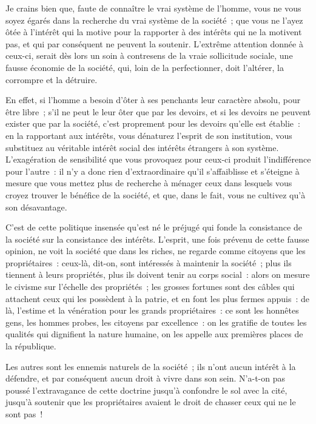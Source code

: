 \documentclass[french,twoside]{book} %
\begin{document}
Je crains bien que, faute de connaître le vrai système de l’homme, vous ne vous soyez égarés dans la recherche du vrai système de la société ; que vous ne l’ayez ôtée à l’intérêt qui la motive pour la rapporter à des intérêts qui ne la motivent pas, et qui par conséquent ne peuvent la soutenir. L’extrême attention donnée à ceux-ci, serait dès lors un soin à contresens de la vraie sollicitude sociale, une fausse économie de la société, qui, loin de la perfectionner, doit l’altérer, la corrompre et la détruire.\par
En effet, si l’homme a besoin d’ôter à ses penchants leur caractère absolu, pour être libre ; s’il ne peut le leur ôter que par les devoirs, et si les devoirs ne peuvent exister que par la société, c’est proprement pour les devoirs qu’elle est établie : en la rapportant aux intérêts, vous dénaturez l’esprit de son institution, vous substituez au véritable intérêt social des intérêts étrangers à son système. L’exagération de sensibilité que vous provoquez pour ceux-ci produit l’indifférence pour l’autre : il n’y a donc rien d’extraordinaire qu’il s’affaiblisse et s’éteigne à mesure que vous mettez plus de recherche à ménager ceux dans lesquels vous croyez trouver le bénéfice de la société, et que, dans le fait, vous ne cultivez qu’à son désavantage.\par
C’est de cette politique insensée qu’est né le préjugé qui fonde la consistance de la société sur la consistance des intérêts. L’esprit, une fois prévenu de cette fausse opinion, ne voit la société que dans les riches, ne regarde comme citoyens que les propriétaires : ceux-là, dit-on, sont intéressés à maintenir la société ; plus ils tiennent à leurs propriétés, plus ils doivent tenir au corps social : alors on mesure le civisme sur l’échelle des propriétés ; les grosses fortunes sont des câbles qui attachent ceux qui les possèdent à la patrie, et en font les plus fermes appuis : de là, l’estime et la vénération pour les grands propriétaires : ce sont les honnêtes gens, les hommes probes, les citoyens par excellence : on les gratifie de toutes les qualités qui dignifient la nature humaine, on les appelle aux premières places de la république.\par
Les autres sont les ennemis naturels de la société ; ils n’ont aucun intérêt à la défendre, et par conséquent aucun droit à vivre dans son sein. N’a-t-on pas poussé l’extravagance de cette doctrine jusqu’à confondre le sol avec la cité, jusqu’à soutenir que les propriétaires avaient le droit de chasser ceux qui ne le sont pas !\par
\end{document}
